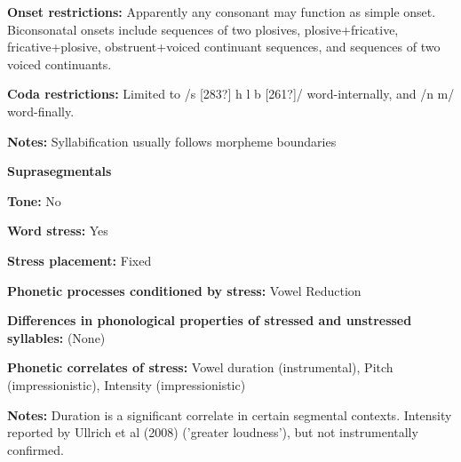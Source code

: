 \begin{styleBody}
\textbf{Onset restrictions:} Apparently any consonant may function as simple onset. Biconsonatal onsets include sequences of two plosives, plosive+fricative, fricative+plosive, obstruent+voiced continuant sequences, and sequences of two voiced continuants.
\end{styleBody}

\begin{styleBody}
\textbf{Coda restrictions: }Limited to /s [283?] h l b [261?]/ word-internally, and /n m/ word-finally.
\end{styleBody}

\begin{styleBody}
\textbf{Notes: }Syllabification usually follows morpheme boundaries
\end{styleBody}

\begin{styleBody}
\textbf{Suprasegmentals}
\end{styleBody}

\begin{styleBody}
\textbf{Tone:} No
\end{styleBody}

\begin{styleBody}
\textbf{Word stress:} Yes
\end{styleBody}

\begin{styleBody}
\textbf{Stress placement:} Fixed
\end{styleBody}

\begin{styleBody}
\textbf{Phonetic processes conditioned by stress:} Vowel Reduction
\end{styleBody}

\begin{styleBody}
\textbf{Differences in phonological properties of stressed and unstressed syllables:} (None)
\end{styleBody}

\begin{styleBody}
\textbf{Phonetic correlates of stress: }Vowel duration (instrumental), Pitch (impressionistic), Intensity (impressionistic)
\end{styleBody}

\begin{styleBody}
\textbf{Notes: }Duration is a significant correlate in certain segmental contexts. Intensity reported by Ullrich et al (2008) (’greater loudness’), but not instrumentally confirmed.
\end{styleBody}

